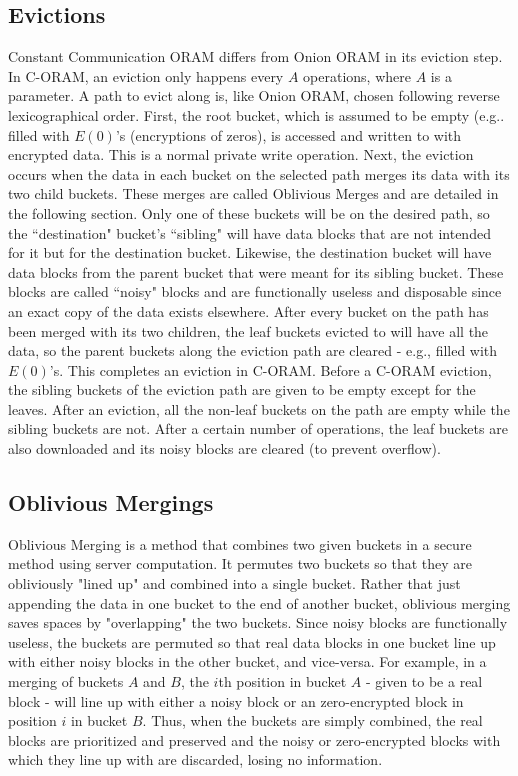 \documentclass[12pt, oneside]{article}   	%
\begin{document}
\subsection{Evictions}
Constant Communication ORAM differs from Onion ORAM in its eviction step. In C-ORAM, an eviction only happens every $A$  operations, where $A$ is a parameter. A path to evict along is, like Onion ORAM, chosen following reverse lexicographical order. First, the root bucket, which is assumed to be empty (e.g.. filled with $E (0)$'s (encryptions of zeros), is accessed and written to with encrypted data. This is a normal private write operation. Next, the eviction occurs when the data in each bucket on the selected path merges its data with its two child buckets. These merges are called Oblivious Merges and are detailed in the following section. Only one of these buckets will be on the desired path, so the ``destination" bucket's ``sibling" will have data blocks that are not intended for it but for the destination bucket. Likewise, the destination bucket will have data blocks from the parent bucket that were meant for its sibling bucket. These blocks are called ``noisy" blocks and are functionally useless and disposable since an exact copy of the data exists elsewhere. After every bucket on the path has been merged with its two children, the leaf buckets evicted to will have all the data, so the parent buckets along the eviction path are cleared - e.g., filled with $E (0)$'s. This completes an eviction in C-ORAM. Before a C-ORAM eviction, the sibling buckets of the eviction path are given to be empty except for the leaves. After an eviction, all the non-leaf buckets on the path are empty while the sibling buckets are not. After a certain number of operations, the leaf buckets are also downloaded and its noisy blocks are cleared (to prevent overflow).

\subsection{Oblivious Mergings}
Oblivious Merging is a method that combines two given buckets in a secure method using server computation. It permutes two buckets so that they are obliviously "lined up" and combined into a single bucket. Rather that just appending the data in one bucket to the end of another bucket, oblivious merging saves spaces by "overlapping" the two buckets. Since noisy blocks are functionally useless, the buckets are permuted so that real data blocks in one bucket line up with either noisy blocks in the other bucket, and vice-versa. For example, in a merging of buckets $A$ and $B$, the $i$th position in bucket $A$ - given to be a real block - will line up with either a noisy block or an zero-encrypted block in position $i$ in bucket $B$. Thus, when the buckets are simply combined, the real blocks are prioritized and preserved and the noisy or zero-encrypted blocks with which they line up with are discarded, losing no information. 
\end{document}
